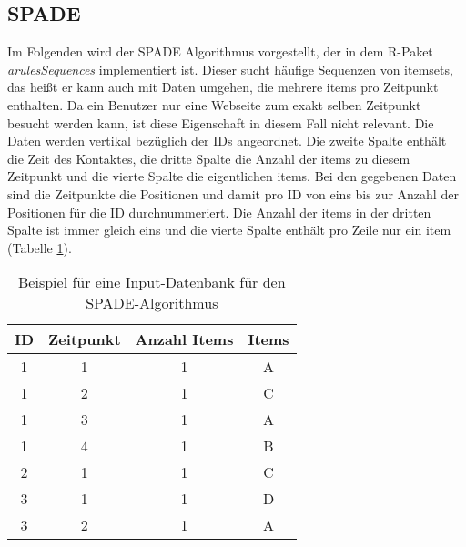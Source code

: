 \subsection{SPADE}
Im Folgenden wird der SPADE Algorithmus \cite{spade} vorgestellt, der in dem R-Paket \textit{arulesSequences} \cite{arulesSequences} implementiert ist. Dieser sucht häufige Sequenzen von itemsets, das heißt er kann auch mit Daten umgehen, die mehrere items pro Zeitpunkt enthalten. Da ein Benutzer nur eine Webseite zum exakt selben Zeitpunkt besucht werden kann, ist diese Eigenschaft in diesem Fall nicht relevant. Die Daten werden vertikal bezüglich der IDs angeordnet. Die zweite Spalte enthält die Zeit des Kontaktes, die dritte Spalte die Anzahl der items zu diesem Zeitpunkt und die vierte Spalte die eigentlichen items. Bei den gegebenen Daten sind die Zeitpunkte die Positionen und damit pro ID von eins bis zur Anzahl der Positionen für die ID durchnummeriert. Die Anzahl der items in der dritten Spalte ist immer gleich eins und die vierte Spalte enthält pro Zeile nur ein item (Tabelle \ref{input}).\\
\begin{table}[hbt]\label{input}
\centering
\begin{tabular}{c|c|c|c}
ID & Zeitpunkt & Anzahl Items & Items \\ \hline
1  & 1				 & 1						& A \\
1  & 2				 & 1						& C \\
1  & 3				 & 1						& A \\
1  & 4				 & 1						& B \\
2  & 1				 & 1						& C \\
3  & 1				 & 1						& D \\
3  & 2				 & 1						& A 
\end{tabular}
\caption{Beispiel für eine Input-Datenbank für den SPADE-Algorithmus}
\end{table}



